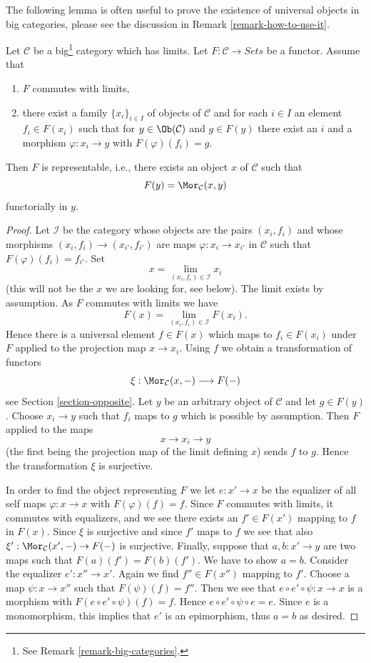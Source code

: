 \noindent
The following lemma is often useful to prove the existence of
universal objects in big categories, please see the discussion
in Remark \ref{remark-how-to-use-it}.

\begin{lemma}
\label{lemma-a-version-of-brown}
Let $\mathcal{C}$ be a big\footnote{See Remark \ref{remark-big-categories}.}
category which has limits. Let $F : \mathcal{C} \to \textit{Sets}$ be a
functor. Assume that
\begin{enumerate}
\item $F$ commutes with limits,
\item there exist a family $\{x_i\}_{i \in I}$ of objects of $\mathcal{C}$
and for each $i \in I$ an element $f_i \in F(x_i)$
such that for $y \in \Ob(\mathcal{C})$ and $g \in F(y)$
there exist an $i$ and a morphism $\varphi : x_i \to y$
with $F(\varphi)(f_i) = g$.
\end{enumerate}
Then $F$ is representable, i.e., there exists an object $x$
of $\mathcal{C}$ such that
$$
F(y) = \Mor_\mathcal{C}(x, y)
$$
functorially in $y$.
\end{lemma}

\begin{proof}
Let $\mathcal{I}$ be the category whose objects are the pairs $(x_i, f_i)$
and whose morphisms $(x_i, f_i) \to (x_{i'}, f_{i'})$ are maps
$\varphi : x_i \to x_{i'}$ in $\mathcal{C}$
such that $F(\varphi)(f_i) = f_{i'}$. Set
$$
x = \lim_{(x_i, f_i) \in \mathcal{I}} x_i
$$
(this will not be the $x$ we are looking for, see below).
The limit exists by assumption. As $F$ commutes with limits
we have
$$
F(x) = \lim_{(x_i, f_i) \in \mathcal{I}} F(x_i).
$$
Hence there is a universal element $f \in F(x)$ which maps to $f_i \in F(x_i)$
under $F$ applied to the projection map $x \to x_i$.
Using $f$ we obtain a transformation of functors
$$
\xi : \Mor_\mathcal{C}(x, - ) \longrightarrow F(-)
$$
see Section \ref{section-opposite}. Let $y$ be an arbitrary object of
$\mathcal{C}$ and let $g \in F(y)$. Choose $x_i \to y$ such that $f_i$
maps to $g$ which is possible by assumption. Then $F$ applied to the maps
$$
x \longrightarrow x_i \longrightarrow y
$$
(the first being the projection map of the limit defining $x$)
sends $f$ to $g$. Hence the transformation $\xi$ is surjective.

\medskip\noindent
In order to find the object representing $F$ we let $e : x' \to x$ be the
equalizer of all self maps $\varphi : x \to x$ with $F(\varphi)(f) = f$.
Since $F$ commutes with limits, it commutes with equalizers, and
we see there exists an $f' \in F(x')$ mapping to $f$ in $F(x)$.
Since $\xi$ is surjective and since $f'$ maps to $f$ we see that
also $\xi' : \Mor_\mathcal{C}(x', -) \to F(-)$ is surjective.
Finally, suppose that $a, b : x' \to y$ are two maps such that
$F(a)(f') = F(b)(f')$. We have to show $a = b$. Consider the equalizer
$e' : x'' \to x'$. Again we find $f'' \in F(x'')$ mapping to $f'$.
Choose a map $\psi : x \to x''$ such that $F(\psi)(f) = f''$.
Then we see that $e \circ e' \circ \psi : x \to x$ is a morphism
with $F(e \circ e' \circ \psi)(f) = f$. Hence
$e \circ e' \circ \psi \circ e = e$. Since $e$ is a monomorphism,
this implies that $e'$ is an epimorphism, thus $a = b$ as desired.
\end{proof}

